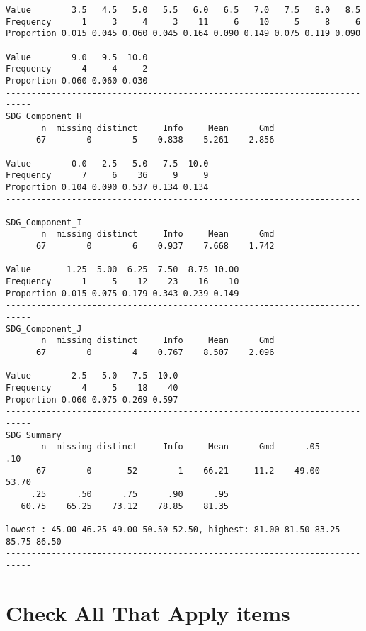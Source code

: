 \documentclass[]{article}
\newenvironment{Shaded}{\begin{snugshade}}{\end{snugshade}}
\newcommand{\KeywordTok}[1]{\textcolor[rgb]{0.13,0.29,0.53}{\textbf{#1}}}
\newcommand{\NormalTok}[1]{#1}
\newcommand{\OperatorTok}[1]{\textcolor[rgb]{0.81,0.36,0.00}{\textbf{#1}}}
\newcommand{\StringTok}[1]{\textcolor[rgb]{0.31,0.60,0.02}{#1}}
\begin{document}
\begin{verbatim}
Value        3.5   4.5   5.0   5.5   6.0   6.5   7.0   7.5   8.0   8.5
Frequency      1     3     4     3    11     6    10     5     8     6
Proportion 0.015 0.045 0.060 0.045 0.164 0.090 0.149 0.075 0.119 0.090
                            
Value        9.0   9.5  10.0
Frequency      4     4     2
Proportion 0.060 0.060 0.030
---------------------------------------------------------------------------
SDG_Component_H 
       n  missing distinct     Info     Mean      Gmd 
      67        0        5    0.838    5.261    2.856 
                                        
Value        0.0   2.5   5.0   7.5  10.0
Frequency      7     6    36     9     9
Proportion 0.104 0.090 0.537 0.134 0.134
---------------------------------------------------------------------------
SDG_Component_I 
       n  missing distinct     Info     Mean      Gmd 
      67        0        6    0.937    7.668    1.742 
                                              
Value       1.25  5.00  6.25  7.50  8.75 10.00
Frequency      1     5    12    23    16    10
Proportion 0.015 0.075 0.179 0.343 0.239 0.149
---------------------------------------------------------------------------
SDG_Component_J 
       n  missing distinct     Info     Mean      Gmd 
      67        0        4    0.767    8.507    2.096 
                                  
Value        2.5   5.0   7.5  10.0
Frequency      4     5    18    40
Proportion 0.060 0.075 0.269 0.597
---------------------------------------------------------------------------
SDG_Summary 
       n  missing distinct     Info     Mean      Gmd      .05      .10 
      67        0       52        1    66.21     11.2    49.00    53.70 
     .25      .50      .75      .90      .95 
   60.75    65.25    73.12    78.85    81.35 

lowest : 45.00 46.25 49.00 50.50 52.50, highest: 81.00 81.50 83.25 85.75 86.50
---------------------------------------------------------------------------
\end{verbatim}

\hypertarget{check-all-that-apply-items}{%
\section{Check All That Apply items}\label{check-all-that-apply-items}}

\begin{Shaded}
\end{Shaded}
\end{document}
